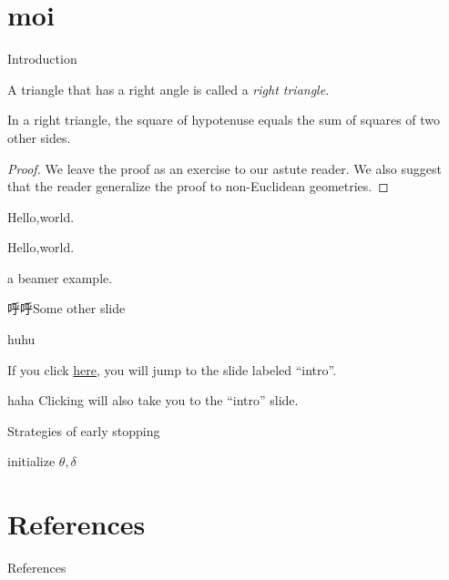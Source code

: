 \documentclass[xcolor=dvipsnames]{beamer}
\begin{document}
\section{moi}
\begin{frame}[label=intro]{Introduction}

  \begin{definition}
    A triangle that has a right angle is called
    a \emph{right triangle}.
  \end{definition}

  \pause

  \begin{theorem}
    In a right triangle, the square of hypotenuse equals
    the sum of squares of two other sides.
  \end{theorem}

  \pause

  \begin{proof}
    We leave the proof as an exercise to our astute reader.
    We also suggest that the reader generalize the proof to
    non-Euclidean geometries.
  \end{proof}
\end{frame}
\begin{frame}{Hello,world.}
  \begin{corollary}
    Hello,world.
  \end{corollary}
  \pause
  \begin{example}
    a beamer example.
  \end{example}
\end{frame}


\begin{frame}{呼呼}{Some other slide}
  \begin{block}{}
    huhu
  \end{block}
  If you click \hyperlink{intro}{here}, you will jump to the slide
  labeled ``intro''.
  \bigskip
  \begin{block}{haha}
    Clicking \hyperlink{intro}{} will also
    take you to the ``intro'' slide.
  \end{block}

\end{frame}

\begin{frame}{Strategies of early stopping }

  \begin{algorithm}[H]
    \SetAlgoLined
      initialize $\theta,\delta$\;
  \end{algorithm}

\end{frame}

\section*{References}
\begin{frame}[allowframebreaks]{References}

  

\end{frame}

\end{document}
